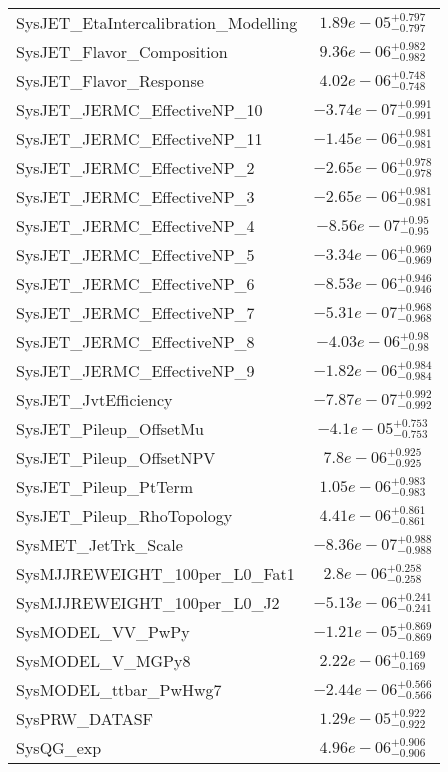\begin{tabular}{|l|c|}
SysJET\_EtaIntercalibration\_Modelling & $1.89e-05^{+0.797}_{-0.797}$ \\
SysJET\_Flavor\_Composition & $9.36e-06^{+0.982}_{-0.982}$ \\
SysJET\_Flavor\_Response & $4.02e-06^{+0.748}_{-0.748}$ \\
SysJET\_JERMC\_EffectiveNP\_10 & $-3.74e-07^{+0.991}_{-0.991}$ \\
SysJET\_JERMC\_EffectiveNP\_11 & $-1.45e-06^{+0.981}_{-0.981}$ \\
SysJET\_JERMC\_EffectiveNP\_2 & $-2.65e-06^{+0.978}_{-0.978}$ \\
SysJET\_JERMC\_EffectiveNP\_3 & $-2.65e-06^{+0.981}_{-0.981}$ \\
SysJET\_JERMC\_EffectiveNP\_4 & $-8.56e-07^{+0.95}_{-0.95}$ \\
SysJET\_JERMC\_EffectiveNP\_5 & $-3.34e-06^{+0.969}_{-0.969}$ \\
SysJET\_JERMC\_EffectiveNP\_6 & $-8.53e-06^{+0.946}_{-0.946}$ \\
SysJET\_JERMC\_EffectiveNP\_7 & $-5.31e-07^{+0.968}_{-0.968}$ \\
SysJET\_JERMC\_EffectiveNP\_8 & $-4.03e-06^{+0.98}_{-0.98}$ \\
SysJET\_JERMC\_EffectiveNP\_9 & $-1.82e-06^{+0.984}_{-0.984}$ \\
SysJET\_JvtEfficiency & $-7.87e-07^{+0.992}_{-0.992}$ \\
SysJET\_Pileup\_OffsetMu & $-4.1e-05^{+0.753}_{-0.753}$ \\
SysJET\_Pileup\_OffsetNPV & $7.8e-06^{+0.925}_{-0.925}$ \\
SysJET\_Pileup\_PtTerm & $1.05e-06^{+0.983}_{-0.983}$ \\
SysJET\_Pileup\_RhoTopology & $4.41e-06^{+0.861}_{-0.861}$ \\
SysMET\_JetTrk\_Scale & $-8.36e-07^{+0.988}_{-0.988}$ \\
SysMJJREWEIGHT\_100per\_L0\_Fat1 & $2.8e-06^{+0.258}_{-0.258}$ \\
SysMJJREWEIGHT\_100per\_L0\_J2 & $-5.13e-06^{+0.241}_{-0.241}$ \\
SysMODEL\_VV\_PwPy & $-1.21e-05^{+0.869}_{-0.869}$ \\
SysMODEL\_V\_MGPy8 & $2.22e-06^{+0.169}_{-0.169}$ \\
SysMODEL\_ttbar\_PwHwg7 & $-2.44e-06^{+0.566}_{-0.566}$ \\
SysPRW\_DATASF & $1.29e-05^{+0.922}_{-0.922}$ \\
SysQG\_exp & $4.96e-06^{+0.906}_{-0.906}$ \\

\end{tabular}
